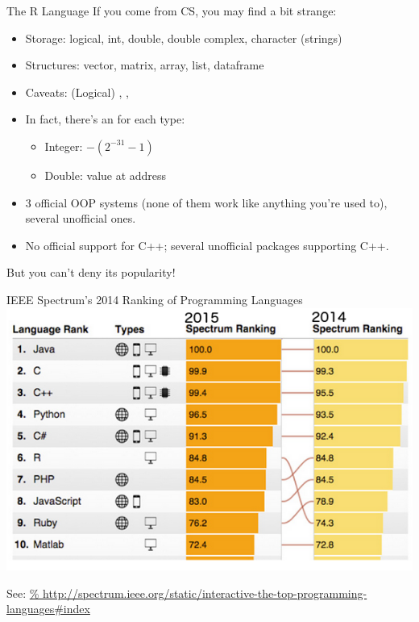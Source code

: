 \begin{frame}
\begin{block}{The R Language}\pause
  If you come from CS, you may find \R a bit strange:
  \begin{itemize}
    \item Storage: logical, int, double, double complex, character (strings)
    \item Structures: vector, matrix, array, list, dataframe
    \item Caveats: (Logical) , , 
    \item In fact, there's an  for each type:
    \begin{itemize}
      \item Integer: $-\left(2^{-31}-1\right)$
      \item Double: value at address 
    \end{itemize}
    \item 3 official OOP systems (none of them work like anything you're used
to), several unofficial ones.
    \item No official support for C++; several unofficial packages supporting
C++.
  \end{itemize}
\end{block}
\end{frame}



\begin{frame}{But you can't deny its popularity!}
  \begin{center}
    IEEE Spectrum's 2014 Ranking of Programming Languages\\
    \includegraphics[scale=.6]{../common/pics/IEEE_Spectrum_Rank}
  \end{center}
 {\scriptsize See:
\url{%
http://spectrum.ieee.org/static/interactive-the-top-programming-languages\#index
}}
\end{frame}




